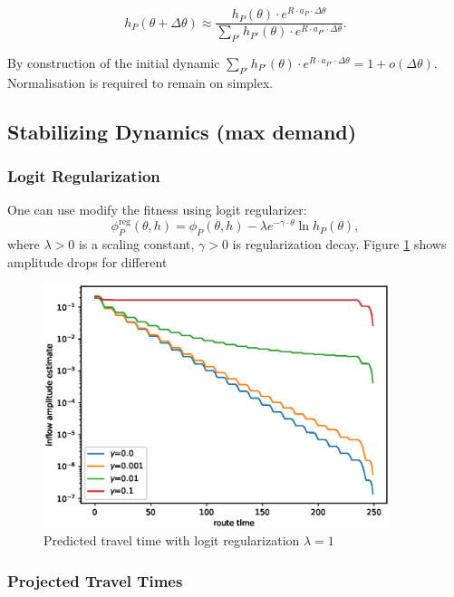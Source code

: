 \documentclass[12pt]{article}
\begin{document}
$$ h_P(\theta + \Delta\theta) \approx \frac{ h_P(\theta) \cdot e^{ R \cdot a_P \cdot \Delta \theta }} { \sum_{P'}  h_{P'}(\theta) \cdot e^{ R \cdot a_{P'} \cdot \Delta\theta } } .$$

By construction of the initial dynamic $\sum_{P'}  h_{P'}(\theta) \cdot e^{ R \cdot a_{P'} \cdot \Delta\theta } = 1 + o(\Delta \theta)$. Normalisation is required to remain on simplex.

\newpage

\subsection*{Stabilizing Dynamics (max demand)}

\subsubsection*{Logit Regularization}

One can use modify the fitness using logit regularizer:
	$$ \phi^{\text{reg}}_P(\theta, h) = \phi_P(\theta, h) - \lambda e^{-\gamma \cdot \theta} \ln{ h_P(\theta) }, $$
where $\lambda > 0$ is a scaling constant, $\gamma > 0$ is regularization decay. Figure \ref{fig:reg_pred_tt} shows amplitude drops for different 

\begin{figure}
	\includegraphics[width=0.9\textwidth]{img/reg_pred_tt.eps}
	\caption{Predicted travel time with logit regularization $\lambda=1$}
	\label{fig:reg_pred_tt}

\end{figure}

\subsubsection*{Projected Travel Times}
\end{document}
